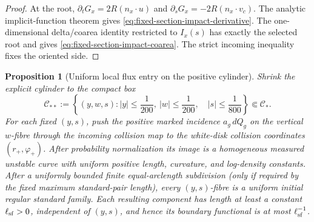 \documentclass[11pt]{article}
\newtheorem{proposition}[theorem]{Proposition}
\begin{document}
\begin{proof}
At the root,
$\partial_tG_x=2R(n_x\cdot u)$ and
$\partial_sG_x=-2R(n_x\cdot v_c)$.  The analytic implicit-function theorem
gives \eqref{eq:fixed-section-impact-derivative}.  The one-dimensional
delta/coarea identity restricted to $I_x(s)$ has exactly the selected root and
gives \eqref{eq:fixed-section-impact-coarea}.  The strict incoming inequality
fixes the oriented side.
\end{proof}

\begin{proposition}[Uniform local flux entry on the positive cylinder]
\label{prop:fixed-section-local-standard-family-entry}
Shrink the explicit cylinder to the compact box
\begin{equation}
\label{eq:fixed-section-compact-entry-box}
 \mathcal C_{**}:=\left\{(y,w,s):
 |y|\le\frac1{200},\ |w|\le\frac1{200},\quad
 |s|\le\frac1{800}\right\}\Subset\mathcal C_*.
\end{equation}
For each fixed $(y,s)$, push the positive marked incidence
$a_g\,dQ_g$ on the vertical $w$-fibre through the incoming collision map to
the white-disk collision coordinates $(r_+,\varphi_+)$.  After probability
normalization its image is a homogeneous measured unstable curve with
uniform positive length, curvature, and log-density constants.  After a
uniformly bounded finite equal-arclength subdivision (only if required by
the fixed maximum standard-pair length), every $(y,s)$-fibre is a uniform
initial regular standard family.  Each resulting component has length at
least a constant $\ell_{\rm sf}>0$, independent of $(y,s)$, and hence its
boundary functional is at most $\ell_{\rm sf}^{-1}$.


\end{proposition}
\end{document}
